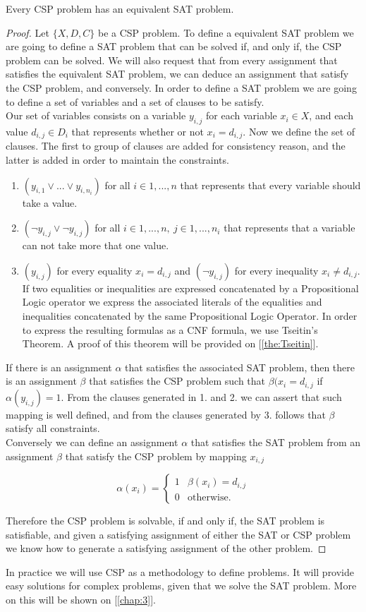 \begin{proposition}
  Every CSP problem has an equivalent SAT problem.
\end{proposition}
\begin{proof}
  Let $ \{X,D,C\}$ be a CSP problem. To define a equivalent SAT problem we are going to define a SAT problem that can be solved if, and only if, the CSP problem can be solved. We will also request that from every assignment that satisfies the equivalent SAT problem, we can deduce an assignment that satisfy the CSP problem, and conversely. In order to define a SAT problem we are going to define a set of variables and a set of clauses to be satisfy.\\

  Our set of variables consists on a variable $y_{i,j}$ for each variable $x_i\in X$, and each value $d_{i,j}\in D_i$ that represents whether or not $x_i = d_{i,j}$. Now we define the set of clauses. The first to group of clauses are added for consistency reason, and the latter is added in order to maintain the constraints.
  \begin{enumerate}
  \item $(y_{i,1}\vee ... \vee y_{i,n_i})$ for all $i\in 1,...,n$ that represents that every variable should take a value.
  \item $(\neg y_{i,j} \vee \neg y_{i,j})$ for all $i\in 1,...,n,\ j\in 1,...,n_i$ that represents that a variable can not take more that one value.
  \item $(y_{i,j})$ for every equality $x_i = d_{i,j}$ and $(\neg y_{i,j})$ for every inequality $x_i \ne d_{i,j}$. If two equalities or inequalities are expressed concatenated by a Propositional Logic operator we express the associated literals of the equalities and inequalities concatenated by the same Propositional Logic Operator. In order to express the resulting formulas as a CNF formula, we use Tseitin's Theorem. A proof of this theorem will be provided on [\ref{the:Tseitin}].
  \end{enumerate}

  If there is an assignment $\alpha$ that satisfies the associated SAT problem, then there is an assignment $\beta$ that satisfies the CSP problem such that $\beta(x_i=d_{i,j}$ if $\alpha(y_{i,j}) = 1$. From the clauses generated in 1. and 2. we can assert that such mapping is well defined, and from the clauses generated by 3. follows that $\beta$ satisfy all constraints.\\

  Conversely we can define an assignment $\alpha$ that satisfies the SAT problem from an assignment $\beta$ that satisfy the CSP problem by mapping $x_{i,j}$ 

$$
\alpha(x_{i})=
\begin{cases}
  1 & \beta(x_{i}) = d_{i,j}\\
  0 & \text{otherwise}.
\end{cases}
$$

Therefore the CSP problem is solvable, if and only if, the SAT problem is satisfiable, and given a satisfying assignment of either the SAT or CSP problem we know how to generate a satisfying assignment of the other problem.
\end{proof}

In practice we will use CSP as a methodology to define problems. It will provide easy solutions for complex problems, given that we solve the SAT problem. More on this will be shown on [\ref{chap:3}].
